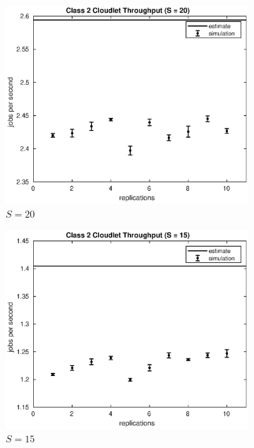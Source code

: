 \begin{figure}[!h]
\centering
%
\begin{subfigure}[t]{0.49\textwidth}
\includegraphics[width=\textwidth]{figures/simul/20_500K_x2clet}
\caption{$S = 20$}
\label{20_x2clet}
\end{subfigure}
%
\begin{subfigure}[t]{0.49\textwidth}
\includegraphics[width=\textwidth]{figures/simul/15_500K_x2clet}
\caption{$S = 15$}
\label{15_x2clet}
\end{subfigure}
%
\begin{subfigure}[t]{0.49\textwidth}

\end{subfigure}
\end{figure}
